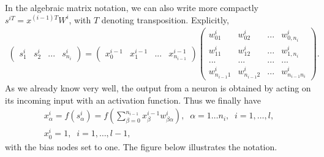 \documentclass[a4paper,12pt,polish]{jupyterBook}
\begin{document}
\sphinxAtStartPar
In the algebraic matrix notation, we can also write more compactly
\(s^{iT} = x^{(i-1)T} W^i\), with \(T\) denoting transposition. Explicitly,
\begin{equation*}
\begin{split}
\begin{pmatrix} s^i_1 & s^i_2 & ...& s^i_{n_i} \end{pmatrix} = 
\begin{pmatrix} x^{i-1}_0 & x^{i-1}_1 & ...& x^{i-1}_{n_{i-1}} \end{pmatrix}
\begin{pmatrix} w^i_{01} & w^i_{02} & ...& w^i_{0,n_i} \\ w^i_{11} & w^i_{12} & ...& w^i_{1,n_i} \\ 
 ... & ... & ...& ... \\ w^i_{n_{i-1}1} & w^i_{n_{i-1}2} & ...& w^i_{n_{i-1}n_i} \end{pmatrix}.
\end{split}
\end{equation*}
\sphinxAtStartPar
As we already know very well, the output from a neuron is obtained by acting on its incoming input with an activation function. Thus we finally have
\begin{equation*}
\begin{split} 
x^i_\alpha  = f(s^i_\alpha) = f \left (\sum_{\beta=0}^{n_{i-1}} x^{i-1}_\beta w^i_{\beta \alpha} \right), \;\; \alpha=1\dots n_i, \;\; i=1,\dots,l , \\
x^i_0 =1, \;\; i=1,\dots,l-1,  
\end{split}
\end{equation*}
\sphinxAtStartPar
with the bias nodes set to one.
The figure below illustrates the notation.
\begin{sphinxVerbatimOutput}

\noindent{}
\end{sphinxVerbatimOutput}
\end{document}
